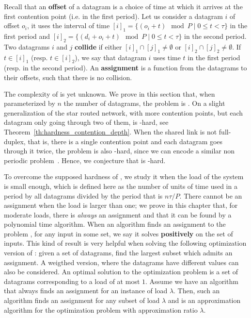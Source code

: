  Recall that an \textbf{offset} of a datagram is a choice of time at which it arrives
 at the first contention point (i.e. in the first period). Let us consider a datagram $i$
 of offset $o_i$, it uses the interval of time $[i]_1 = \{ (o_i + t) \mod P \mid 0 \leq t < \tau \}$ in the first period and $[i]_2 = \{ (d_i + o_i + t) \mod P \mid 0 \leq t < \tau \}$ in the second period. Two datagrams $i$ and $j$ \textbf{collide} if either $[i]_1 \cap [j]_1 \neq \emptyset $ or $[i]_2 \cap [j]_2 \neq \emptyset $. If $t \in [i]_1$ (resp. $t \in [i]_2$), we say that datagram $i$ uses time $t$ in the first period (resp. in the second period). An \textbf{assignment} is a function from the datagrams to their offsets, such that there is no collision.


The complexity of \pma is yet unknown. We prove in this section that, when parameterized by
$n$ the number of datagrams, the problem is \FPT. On a slight generalization of the star routed network, with more contention points, but each datagram only going through two of them, \pazl is \NP-hard, see Theorem~\ref{th:hardness_contention_depth}. When the shared link is not full-duplex, that is, there is a single contention point and each datagram goes through it twice, the problem is also \NP-hard, since we can encode a similar non periodic problem~\cite{orman1997complexity}. Hence, we conjecture that \pma is \NP-hard.

To overcome the supposed hardness of \pma, we study it when the load of the system is small enough, which is defined here as
the number of units of time used in a period by all datagrams divided by the period that is $n\tau /P$. There cannot be an assignment when the load is larger than one; we prove in this chapter that, for moderate loads, there is \emph{always} an assignment and that it can be found by a polynomial time algorithm. When an algorithm finds an assignment to the problem \pma, for any input in some set, we say it solves \pma \textbf{positively} on the set of inputs. This kind of result is very helpful when solving the following optimization version of \pma: given a set of datagrams, find the largest subset which admits an assignment. A weigthed version, where the datagrams have different values can also be considered. An optimal solution to the optimization problem is a set of datagrams corresponding to a load of at most $1$. Assume we have an algorithm that always finds an assignment for an instance of load $\lambda$. Then, such an algorithm finds an assignment for any subset of load $\lambda$ and is an approximation algorithm for the optimization problem with approximation ratio $\lambda$.


